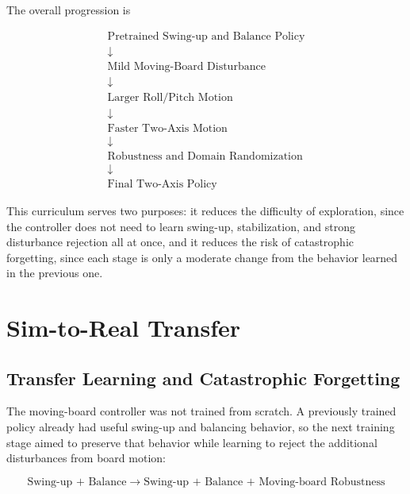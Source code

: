\documentclass[9pt]{extarticle}
\begin{document}
The overall progression is

\begin{equation}
\boxed{
\begin{array}{c}
\text{Pretrained Swing-up and Balance Policy}\\
\downarrow\\
\text{Mild Moving-Board Disturbance}\\
\downarrow\\
\text{Larger Roll/Pitch Motion}\\
\downarrow\\
\text{Faster Two-Axis Motion}\\
\downarrow\\
\text{Robustness and Domain Randomization}\\
\downarrow\\
\text{Final Two-Axis Policy}
\end{array}
}
\end{equation}

This curriculum serves two purposes: it reduces the difficulty of
exploration, since the controller does not need to learn swing-up,
stabilization, and strong disturbance rejection all at once, and it reduces
the risk of catastrophic forgetting, since each stage is only a moderate
change from the behavior learned in the previous one.

\section{Sim-to-Real Transfer}

\subsection{Transfer Learning and Catastrophic Forgetting}

The moving-board controller was not trained from scratch. A previously
trained policy already had useful swing-up and balancing behavior, so the
next training stage aimed to preserve that behavior while learning to
reject the additional disturbances from board motion:

\begin{equation}
\boxed{
\text{Swing-up + Balance}
\;\longrightarrow\;
\text{Swing-up + Balance + Moving-board Robustness}
}
\end{equation}
\end{document}
